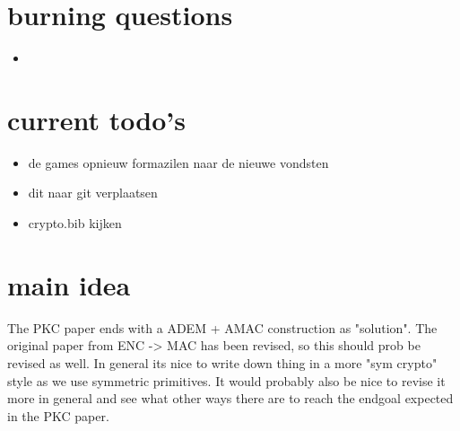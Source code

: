 \documentclass{article}
\begin{document}
\newpage
\section{burning questions}
\begin{itemize}
   \item 
   
\end{itemize}
\newpage
\section{current todo's}
\begin{itemize}
    \item de games opnieuw formazilen naar de nieuwe vondsten
    \item dit naar git verplaatsen
    \item crypto.bib kijken
\end{itemize}
\newpage
\section{main idea}
The PKC paper ends with a ADEM + AMAC construction as "solution". The original paper from ENC -> MAC has been revised, so this should prob be revised as well. In general its nice to write down thing in a more "sym crypto" style as we use symmetric primitives. It would probably also be nice to revise it more in general and see what other ways there are to reach the endgoal expected in the PKC paper.
\end{document}
